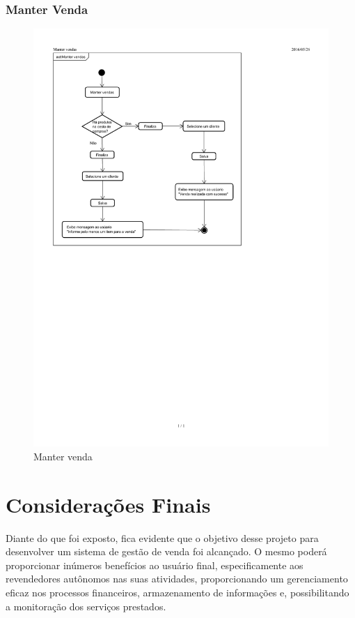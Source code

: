 \documentclass[chapter=TITLE,12pt,oneside,a4paper,english,french,sumario=tradicional,spanish,brazil,]{abntex2}
\begin{document}
\subsection{Manter Venda}
\begin{figure}[h]\centering
	\includegraphics[scale=1.29]{venda.pdf}\caption{Manter venda}
\end{figure}

\chapter{Considerações Finais}
Diante do que foi exposto, fica evidente que o objetivo desse projeto para desenvolver um sistema de gestão de venda foi alcançado. O mesmo poderá proporcionar inúmeros benefícios ao usuário final, especificamente aos revendedores autônomos nas suas atividades, proporcionando um gerenciamento eficaz nos processos financeiros, armazenamento de informações e, possibilitando a monitoração dos serviços prestados.
\end{document}
